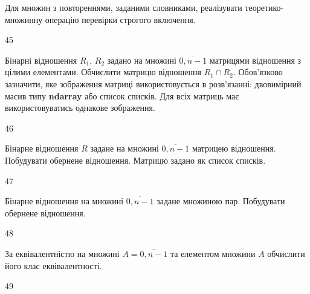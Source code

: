 Для множин з повтореннями, заданими словниками, реалізувати теоретико-множинну операцію перевірки строгого включення.
\\\par
45 














Бінарні відношення $R_1$, $R_2$ задано на множині $\overline{0,n-1}$ матрицями відношення з цілими елементами. Обчислити матрицю відношення $R_1\cap R_2$. Обов'язково зазначити, яке зображення матриці використовується в розв'язанні: двовимірний масив типу \textbf{ndarray} або список списків. Для всіх матриць має використовуватись однакове зображення.
\\\par
46 














Бінарне відношення $R$ задане на множині $\overline{0,n-1}$ матрицею відношення. Побудувати обернене відношення. Матрицю задано як список списків.
\\\par
47 














Бінарне відношення на множині $\overline{0,n-1}$ задане множиною пар. Побудувати обернене відношення.
\\\par
48 














За еквівалентністю на множині $A=\overline{0,n-1}$ та елементом множини $A$ обчислити його клас еквівалентності.
\\\par
49 














